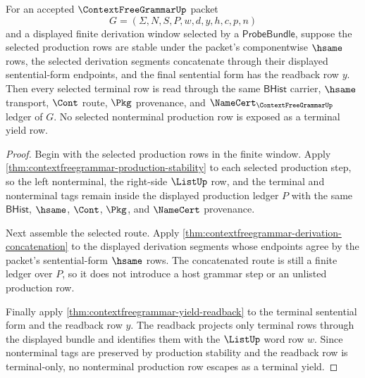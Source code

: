 \begin{theorem}
\label{thm:contextfreegrammar-terminal-yield-window}
For an accepted $\ContextFreeGrammarUp$ packet
$$
G=(\Sigma,N,S,P,w,d,y,h,c,p,n)
$$
and a displayed finite derivation window selected by a
$\mathsf{ProbeBundle}$, suppose the selected production rows are stable under
the packet's componentwise $\hsame$ rows, the selected derivation segments
concatenate through their displayed sentential-form endpoints, and the final
sentential form has the readback row $y$. Then every selected terminal row is
read through the same $\mathsf{BHist}$ carrier, $\hsame$ transport,
$\Cont$ route, $\Pkg$ provenance, and $\NameCert_{\ContextFreeGrammarUp}$
ledger of $G$. No selected nonterminal production row is exposed as a
terminal yield row.
\end{theorem}
\begin{proof}
Begin with the selected production rows in the finite window. Apply
\autoref{thm:contextfreegrammar-production-stability} to each selected
production step, so the left nonterminal, the right-side $\ListUp$ row, and
the terminal and nonterminal tags remain inside the displayed production
ledger $P$ with the same $\mathsf{BHist}$, $\hsame$, $\Cont$, $\Pkg$, and
$\NameCert$ provenance.

Next assemble the selected route. Apply
\autoref{thm:contextfreegrammar-derivation-concatenation} to the displayed
derivation segments whose endpoints agree by the packet's sentential-form
$\hsame$ rows. The concatenated route is still a finite ledger over $P$, so it
does not introduce a host grammar step or an unlisted production row.

Finally apply \autoref{thm:contextfreegrammar-yield-readback} to the terminal
sentential form and the readback row $y$. The readback projects only terminal
rows through the displayed bundle and identifies them with the $\ListUp$ word
row $w$. Since nonterminal tags are preserved by production stability and the
readback row is terminal-only, no nonterminal production row escapes as a
terminal yield.
\end{proof}


